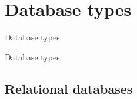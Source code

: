 \documentclass{beamer}
\begin{document}
\begin{frame}
\end{frame}





\section{Database types}

\begin{frame}[plain]
	Database types
\end{frame}

\begin{frame}[plain]
	Database types
\end{frame}

\subsection{Relational databases}
\end{document}
